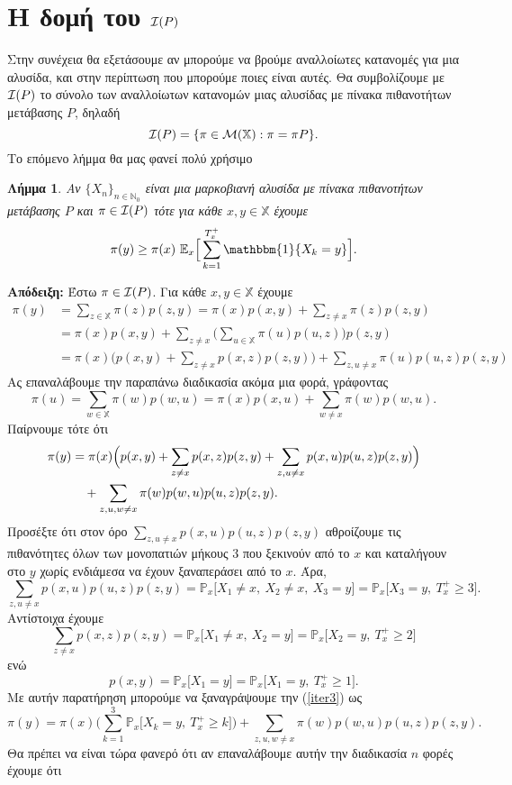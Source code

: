\documentclass[11pt]{article}
\newtheorem{lemma}{Λήμμα}
\def\N{\mathbb{N}}
\def\X{\mathbb{X}}
\def\P{\mathbb{P}}
\def\E{\mathbb{E}}
\def\MX{{\cal M}(\X)}
\def\xn{\{X_n\}_{n\in\N_0}}
\def\beq{\begin{equation}}
\def\eeq{\end{equation}}
\def\IP{{\cal I}(P)}
\newcommand{\Px}[1]{\P_x\big[#1\big]}
\begin{document}
\section{Η δομή του $\IP$}
Στην συνέχεια θα εξετάσουμε αν μπορούμε να βρούμε αναλλοίωτες κατανομές για μια αλυσίδα, και στην περίπτωση που μπορούμε ποιες είναι αυτές. Θα συμβολίζουμε με $\IP$ το σύνολο των αναλλοίωτων κατανομών μιας αλυσίδας με πίνακα πιθανοτήτων μετάβασης $P$, δηλαδή
\[
\IP=\{\pi\in\MX: \pi=\pi P\}.
\]
Το επόμενο λήμμα θα μας φανεί πολύ χρήσιμο
\begin{lemma}
\label{idcomparison}
Αν $\xn$ είναι μια μαρκοβιανή αλυσίδα με πίνακα πιθανοτήτων μετάβασης $P$ και $\pi\in\IP$ τότε για κάθε $x,y\in\X$ έχουμε
\beq
\pi(y)\ge\pi(x)\ \E_x\Big[\sum_{k=1}^{T_x^+}\mathbbm{1}\{X_k=y\}\Big].
\label{compleq}
\eeq
\end{lemma}
{\bf Απόδειξη:} Έστω $\pi\in\IP$. Για κάθε $x,y\in\X$ έχουμε
\begin{align*}
\pi(y)&=\sum_{z\in\X}\pi(z)p(z,y)=\pi(x)p(x,y)+\sum_{z\neq x}\pi(z)p(z,y)\\
&=\pi(x)p(x,y)+\sum_{z\neq x}\Big(\sum_{u\in\X}\pi(u)p(u,z)\Big)p(z,y)\\
&=\pi(x)\Big(p(x,y)+\sum_{z\neq x}p(x,z)p(z,y)\Big)+\sum_{z,u\neq x}\pi(u)p(u,z)p(z,y)
\end{align*}
Aς επαναλάβουμε την παραπάνω διαδικασία ακόμα μια φορά, γράφοντας
\[
\pi(u)=\sum_{w\in\X}\pi(w)p(w,u)=\pi(x)p(x,u)+\sum_{w\neq x}\pi(w)p(w,u).
\]
Παίρνουμε τότε ότι
\begin{align}
\pi(y)&=\pi(x)\Big(p(x,y)+\sum_{z\neq x}p(x,z)p(z,y)+\sum_{z,u\neq x}p(x,u)p(u,z)p(z,y)\Big)\notag\\&\quad+\sum_{z,u,w\neq x}\pi(w)p(w,u)p(u,z)p(z,y).
\label{iter3}
\end{align}
Προσέξτε ότι στον όρο $\sum_{z,u\neq x}p(x,u)p(u,z)p(z,y)$ αθροίζουμε τις πιθανότητες όλων των μονοπατιών μήκους 3 που ξεκινούν από το $x$ και καταλήγουν στο $y$ χωρίς ενδιάμεσα να έχουν ξαναπεράσει από το $x$. Άρα,
\[
\sum_{z,u\neq x}p(x,u)p(u,z)p(z,y)=\Px{X_1\neq x,\ X_2\neq x,\ X_3=y}=\Px{X_3=y,\ T_x^+\ge 3}.
\]
Αντίστοιχα έχουμε
\[
\sum_{z\neq x}p(x,z)p(z,y)=\Px{X_1\neq x,\ X_2=y}=\Px{X_2=y,\ T_x^+\ge 2}
\]
ενώ
\[
p(x,y)=\Px{X_1=y}=\Px{X_1=y,\ T_x^+\ge 1}.
\]
Με αυτήν παρατήρηση μπορούμε να ξαναγράψουμε την (\ref{iter3}) ως
\[
\pi(y)=\pi(x)\Big(\sum_{k=1}^3\Px{X_k=y,\ T_x^+\ge k}\Big)+\sum_{z,u,w\neq x}\pi(w)p(w,u)p(u,z)p(z,y).
\]
Θα πρέπει να είναι τώρα φανερό ότι αν επαναλάβουμε αυτήν την διαδικασία $n$ φορές έχουμε ότι
\end{document}
